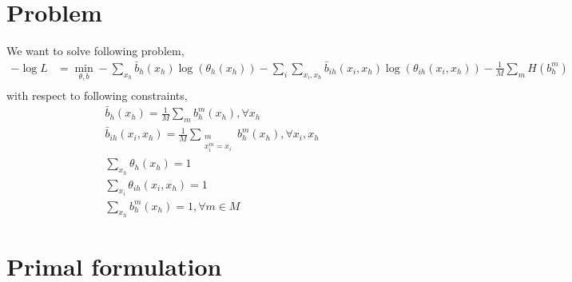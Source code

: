 \documentclass{article}
\begin{document}
\section{Problem}
We want to solve following problem,
\begin{align*}
-\log L&=\min_{\theta,b}-\sum_{x_h}\bar{b}_h(x_h)\log(\theta_h(x_h))-\sum_i \sum_{x_i,x_h} \bar{b}_{ih}(x_i,x_h)\log(\theta_{ih}(x_i,x_h))-\frac{1}{M}\sum_mH(b_h^m)\\
\end{align*}
with respect to following constraints,
\begin{align*}
&\bar{b}_h(x_h)=\frac{1}{M}\sum_m b_h^m(x_h), \forall x_h\\
&\bar{b}_{ih}(x_i,x_h)=\frac{1}{M}\sum_{\substack{m\\ x_i^m=x_i}}b_h^m(x_h),  \forall x_i, x_h \\
&\sum_{x_h}\theta_h(x_h)=1\\
&\sum_{x_i}\theta_{ih}(x_i,x_h)=1\\
&\sum_{x_h}b_h^m(x_h)=1, \forall m\in M
\end{align*}
\section{Primal formulation}
\end{document}

